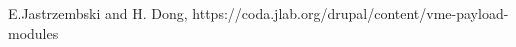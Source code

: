 \documentclass{desyproc}
\begin{document}


 

\begin{footnotesize}
\begin{thebibliography}{99}
E.Jastrzembski and H. Dong, https://coda.jlab.org/drupal/content/vme-payload-modules
\end{thebibliography}
\end{footnotesize}


 
\end{document}
